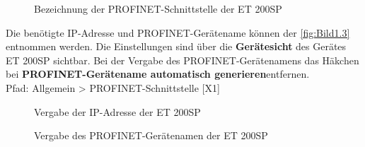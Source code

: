 \begin{figure}[H]
   \centering
   \caption[Bezeichnung der PROFINET-Schnitstelle der ET 200SP]{Bezeichnung der PROFINET-Schnittstelle der ET 200SP}
   \label{fig:Bild4.8}
\end{figure}

Die benötigte IP-Adresse und PROFINET-Gerätename können der \autoref{fig:Bild1.3} entnommen werden. Die Einstellungen sind über die \textbf{Gerätesicht} des Gerätes ET 200SP sichtbar. Bei der Vergabe des PROFINET-Gerätenamens das Häkchen bei \glqq\textbf{PROFINET-Gerätename automatisch generieren}\grqq\:entfernen.\\
Pfad: Allgemein > PROFINET-Schnittstelle [X1]

\begin{figure}[H]
   \centering
   \caption[Vergabe der IP-Adresse der ET 200SP]{Vergabe der IP-Adresse der ET 200SP}
   \label{fig:Bild4.9}
\end{figure}

\begin{figure}[H]
   \centering
   \caption[Vergabe des PROFINET-Gerätenamen der ET 200SP]{Vergabe des PROFINET-Gerätenamen der ET 200SP}
   \label{fig:Bild4.10}
\end{figure}
